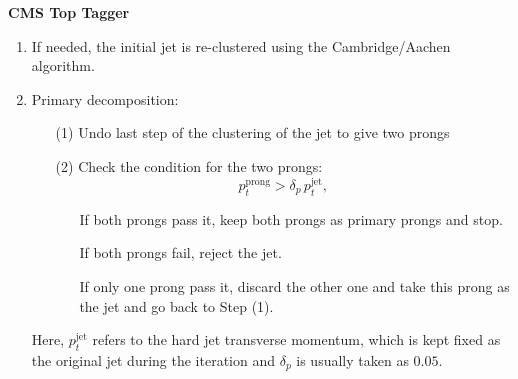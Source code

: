 \documentclass[9pt,a4paper,unknownkeysallowed,xcolor=dvipsnames,aspectratio=43]{beamer}
\begin{document}
\begin{frame}{\bf \huge CMS Top Tagger}
\vspace{2mm}

\begin{enumerate}
\item If needed, the initial jet is re-clustered using the Cambridge/Aachen
  algorithm.\vspace{4mm}
%
\item {\color{darkred} Primary decomposition}: 
\vspace{2mm}
\begin{itemize}
    \item[(1)] Undo last step of the clustering of the jet to give two prongs
    \vspace{2mm}
    \item[(2)] Check the condition for the two prongs:
     \begin{equation}\label{eq:cms-top-cdt}
    p_t^{\mathrm{prong}} > \delta_p \, p_t^{\text{jet}},
  \end{equation}
    \begin{itemize}
        \item[\diamondsuit] If both prongs pass it, keep both prongs as {\color{darkred}primary prongs} and stop.
        \vspace{2mm}
        \item[\diamondsuit] If both prongs fail, reject the jet.
        \vspace{2mm}
        \item[\diamondsuit] If only one prong pass it, discard the other one and take this prong as the jet and go back to Step (1).
    \end{itemize}
\end{itemize}
\vspace{2mm}
Here, $p_t^{\text{jet}}$ refers to the hard jet transverse
  momentum, which is kept fixed as the original jet during the iteration and $\delta_p$ is usually taken as
  $0.05$.
\end{enumerate}
\end{frame}
%
%
\end{document}
